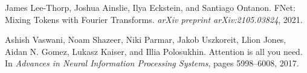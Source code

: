 \documentclass[11pt,a4paper]{article}
\begin{document}

\begin{thebibliography}{99}

James Lee-Thorp, Joshua Ainslie, Ilya Eckstein, and Santiago Ontanon.
\newblock FNet: Mixing Tokens with Fourier Transforms.
\newblock \emph{arXiv preprint arXiv:2105.03824}, 2021.

Ashish Vaswani, Noam Shazeer, Niki Parmar, Jakob Uszkoreit, Llion Jones, Aidan N. Gomez, Lukasz Kaiser, and Illia Polosukhin.
\newblock Attention is all you need.
\newblock In \emph{Advances in Neural Information Processing Systems}, pages 5998--6008, 2017.

\end{thebibliography}
\end{document}

